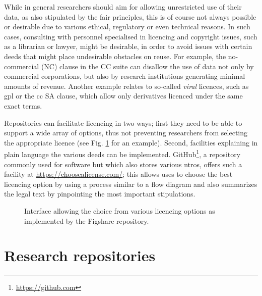 While in general researchers should aim for allowing unrestricted use of their data, as also stipulated by the \gls{fair} principles, this is of course not always possible or desirable due to various ethical, regulatory or even technical reasons. In such cases, consulting with personnel specialised in licencing and copyright issues, such as a librarian or lawyer, might be desirable, in order to avoid issues with certain deeds that might place undesirable obstacles on reuse. For example, the no-commercial (NC) clause in the CC suite can disallow the use of data not only by commercial corporations, but also by research institutions generating minimal amounts of revenue\cite{ccbyncndrisks}. Another example relates to so-called \emph{viral} licences, such as \gls{gpl} or the \gls{cc} SA clause, which allow only derivatives licenced under the same exact terms.

Repositories can facilitate licencing in two ways; first they need to be able to support a wide array of options, thus not preventing researchers from selecting the appropriate licence (see Fig. \ref{fig:lic} for an example). Second, facilities explaining in plain language the various deeds can be implemented. GitHub\footnote{\url{https://github.com}}, a repository commonly used for software but which also stores various \glspl{ntro}, offers such a facility at \url{https://choosealicense.com/}; this allows uses to choose the best licencing option by using a process similar to a flow diagram and also summarizes the legal text by pinpointing the most important stipulations\cite{Blumzon2020}.

\begin{figure}[ht!]
\centering
  \caption{Interface allowing the choice from various licencing options as implemented by the Figshare repository.}
  \label{fig:lic}
\end{figure}

\clearpage

\section{Research repositories}
\label{sec:research}